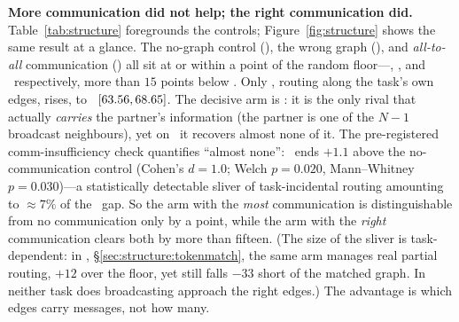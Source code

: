\textbf{More communication did not help; the right communication did.}
Table~\ref{tab:structure} foregrounds the controls; Figure~\ref{fig:structure}
shows the same result at a glance.
The no-graph control (\mlpc), the wrong graph (\gwrong), and
\emph{all-to-all} communication (\gcomplete) all sit at or within a point of
the random floor---\SCmlp, \SCwrong, and \SCcomplete\ respectively, more than
$15$ points below \gtrue. Only \gtrue,
routing along the task's own edges, rises, to \SCtrueN\ $[63.56,
68.65]$. The decisive arm is \gcomplete: it is the only rival that
actually \emph{carries} the partner's information (the partner is one of the
$N{-}1$ broadcast neighbours), yet on \pairrouting\ it recovers almost none of
it. The pre-registered comm-insufficiency check quantifies ``almost none'':
\gcomplete\ ends $+1.1$ above the no-communication control (Cohen's
$d{=}1.0$; Welch $p{=}0.020$, Mann--Whitney $p{=}0.030$)---a statistically
detectable sliver of task-incidental routing amounting to ${\approx}7\%$ of
the \gtrue\ gap. So the arm with the \emph{most} communication is
distinguishable from no communication only by a point, while the arm with the
\emph{right} communication clears both by more than fifteen.
(The size of the sliver is task-dependent: in \tokenmatch,
\S\ref{sec:structure:tokenmatch}, the same arm manages real partial routing,
$+12$ over the floor, yet still falls $-33$ short of the matched graph. In
neither task does broadcasting approach the right edges.) The advantage is which
edges carry messages, not how many.

